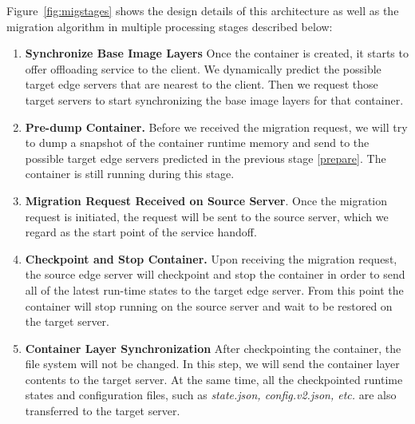 


Figure~\ref{fig:migstages} shows the design details of this architecture as well as the migration algorithm in multiple processing stages described below:

\begin{enumerate}[label=\textbf{S\arabic*}]

\item \label{prepare} \textbf{%
Synchronize Base Image Layers} Once the container is created, it starts to offer offloading service to the client. We dynamically predict the possible target edge servers that are nearest to the client. Then we request those target servers to start synchronizing the base image layers for that container. 

\item \label{predump} \textbf{Pre-dump Container.} Before we received the migration request, we will try to dump a snapshot of the container runtime memory and send to the possible target edge servers predicted in the previous stage \ref{prepare}. The container is still running during this stage. %

\item \label{request}\textbf{Migration Request Received on Source Server}. Once the migration request is initiated, the request will be sent to the source server, which we regard as the start point of the service handoff.


\item \label{checkpoint} \textbf{Checkpoint and Stop Container.} Upon receiving the migration request, the source edge server will checkpoint and stop the container in order to send all of the latest run-time states to the target edge server.
From this point the container will stop running on the source server and wait to be restored on the target server.

\item \label{fs-sync} \textbf{Container Layer Synchronization} After checkpointing the container, the file system will not be changed. In this step, we will send the container layer contents to the target server. At the same time, all the checkpointed runtime states and configuration files, such as \textit{state.json, config.v2.json, etc.} are also transferred to the target server. 


\end{enumerate}
